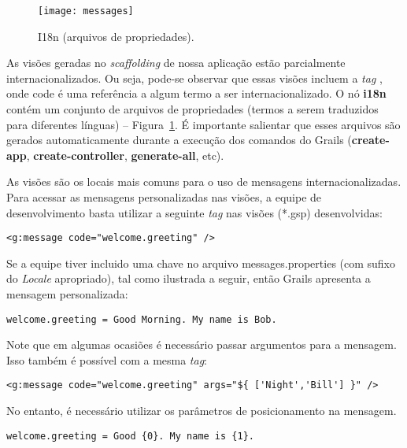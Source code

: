 \begin{figure}[\textit{}htb]
\centering\texttt{[image: messages]}
\caption{I18n (arquivos de propriedades).}
\label{I18nFig}
\end{figure}

As visões  geradas no  {\it scaffolding} de  nossa aplicação  estão parcialmente
internacionalizados. Ou seja,  pode-se observar que essas visões  incluem a {\it
  tag} {\bf  <g:message code>}, onde code é  uma referência a algum  termo a ser
internacionalizado.   O  nó  {\bf  i18n}  contém  um  conjunto  de  arquivos  de
propriedades   (termos   a  serem   traduzidos   para   diferentes  línguas)   –
Figura~\ref{I18nFig}.   É importante  salientar que  esses arquivos  são gerados
automaticamente  durante a execução  dos comandos  do Grails  ({\bf create-app},
{\bf create-controller}, {\bf generate-all}, etc).  

\begin{small}
\begin{cBox}
As   visões   são   os   locais   mais   comuns  para   o   uso   de   mensagens
internacionalizadas.  Para acessar  as  mensagens personalizadas  nas visões,  a
equipe de desenvolvimento basta utilizar a seguinte {\it tag} nas visões (*.gsp)
desenvolvidas: 

\vspace{0.2cm}

\verb#<g:message code="welcome.greeting" />#

\vspace{0.2cm}

\noindent Se  a equipe tiver  incluido uma chave no  arquivo messages.properties
(com  sufixo do {\it  Locale} apropriado),  tal como  ilustrada a  seguir, então
Grails apresenta a mensagem personalizada:

\vspace{0.2cm}

\verb#welcome.greeting = Good Morning. My name is Bob.#

\vspace{0.2cm}

\noindent Note  que em  algumas ocasiões é  necessário passar argumentos  para a
mensagem. Isso também é possível com a mesma {\it tag}:

\vspace{0.2cm}

\verb#<g:message code="welcome.greeting" args="${ ['Night','Bill'] }" />#

\vspace{0.2cm}

\noindent No entanto,  é necessário utilizar os parâmetros  de posicionamento na
mensagem.

\vspace{0.2cm}

\verb#welcome.greeting = Good {0}. My name is {1}.#
\end{cBox}
\end{small}

